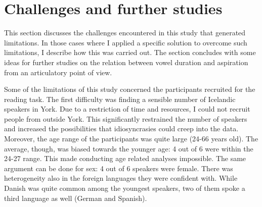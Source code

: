 \documentclass[11pt,a4paper,oneside,openany]{memoir}\usepackage[]{graphicx}\usepackage[]{color}
\begin{document}
%
%

\section{Challenges and further studies}

This section discusses the challenges encountered in this study that generated limitations.
In those cases where I applied a specific solution to overcome such limitations, I describe how this was carried out.
The section concludes with some ideas for further studies on the relation between vowel duration and aspiration from an articulatory point of view.

Some of the limitations of this study concerned the participants recruited for the reading task.
The first difficulty was finding a sensible number of Icelandic speakers in York.
Due to a restriction of time and resources, I could not recruit people from outside York.
This significantly restrained the number of speakers and increased the possibilities that idiosyncrasies could creep into the data.
Moreover, the age range of the participants was quite large (24-66 years old).
The average, though, was biased towards the younger age: 4 out of 6 were within the 24-27 range.
This made conducting age related analyses impossible.
The same argument can be done for sex: 4 out of 6 speakers were female.
There was heterogeneity also in the foreign languages they were confident with.
While Danish was quite common among the youngest speakers, two of them spoke a third language as well (German and Spanish).
\end{document}
